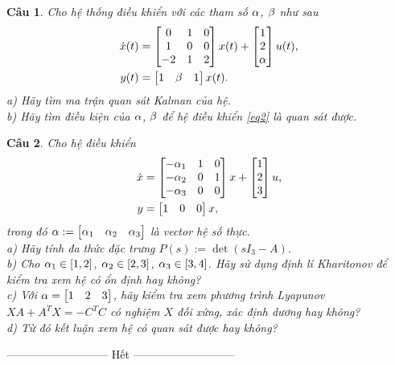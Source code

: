 \documentclass[11pt]{article}
\newtheorem{bt}{Câu}
\begin{document}
\begin{bt}
	Cho hệ thống điều khiển với các tham số $\alpha$, $\beta$ như sau
	\begin{align}\label{eq2}
		\dot{x}(t) &= \begin{bmatrix} 0 & 1 & 0 \\ 1 & 0 & 0 \\ -2 & 1 & 2 \end{bmatrix} x(t) + \begin{bmatrix} 1 \\ 2 \\ \alpha \end{bmatrix} u(t), \\
		y(t) &= \begin{bmatrix} 1 & \beta & 1 \end{bmatrix} x(t). 
	\end{align}
	a) Hãy tìm ma trận quan sát Kalman của hệ. \\
	b) Hãy tìm điều kiện của $\alpha$, $\beta$ để hệ điều khiển \eqref{eq2} là quan sát được. \\ 
\end{bt}

\begin{bt}
	Cho hệ điều khiển
	\begin{align}\label{eq4}
		\dot{x} &= \begin{bmatrix} -\alpha_1 & 1 & 0 \\ -\alpha_2 & 0 & 1 \\ -\alpha_{3} & 0 & 0  \end{bmatrix} x + \begin{bmatrix} 1 \\ 2 \\ 3 \end{bmatrix} u, \\
		y &= \begin{bmatrix} 1 & 0 & 0 \end{bmatrix} x, 
	\end{align}
	trong đó $\alpha := \begin{bmatrix} \alpha_1 & \alpha_2 & \alpha_3  \end{bmatrix}$ là vector hệ số thực. \\
	a) Hãy tính đa thức đặc trưng $P(s) := \det(sI_3-A)$. \\
	b) Cho $\alpha_1 \in [1,2]$, $\alpha_2 \in [2,3]$, $\alpha_3 \in [3,4]$. Hãy sử dụng định lí Kharitonov để kiểm tra xem hệ có ổn định hay không? \\
	c) Với $\alpha = \begin{bmatrix} 1 & 2 & 3 \end{bmatrix}$, hãy kiểm tra xem phương trình Lyapunov $XA +  A^T X = - C^T C$ có nghiệm $X$ đối xứng, xác định dương hay không?  \\
	d) Từ đó kết luận xem hệ có quan sát được hay không?
\end{bt}   

\begin{center}
	--------------------------- Hết ---------------------------
\end{center}
\end{document}
